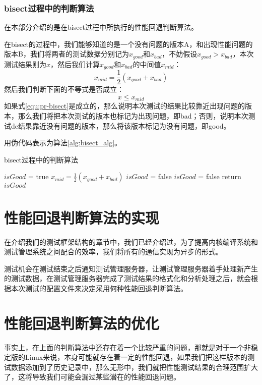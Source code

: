 \subsubsection{bisect过程中的判断算法}
在本部分介绍的是在bisect过程中所执行的性能回退判断算法。

在bisect的过程中，我们能够知道的是一个没有问题的版本A，和出现性能问题的版本B，我们将两者的测试数据分别记为$x_{good}$和$x_{bad}$，不妨假设$x_{good} > x_{bad}$，本次测试结果则为$x$，然后我们计算$x_{good}$和$x_{bad}$的中间值$x_{mid}$：
\begin{equation}
\label{equ:pr-mid}
x_{mid} = \frac{1}{2} (x_{good} + x_{bad})
\end{equation}
然后我们判断下面的不等式是否成立：
\begin{equation}
\label{equ:pr-bisect}
x \leq x_{mid}
\end{equation}
如果式\ref{equ:pr-bisect}是成立的，那么说明本次测试的结果比较靠近出现问题的版本，那么我们将把本次测试的版本也标记为出现问题，即bad；否则，说明本次测试de结果靠近没有问题的版本，那么将该版本标记为没有问题，即good。

用伪代码表示为算法\ref{alg:bisect_alg}。

\begin{algorithm}
\caption{bisect过程中的判断算法}
\label{alg:bisect_alg}
$isGood$ = true\;
$x_{mid} = \frac{1}{2}(x_{good} + x_{bad})$\;
{
	{
		$isGood$ = false\;
	}
}
\Else
{
	{
		$isGood$ = false\;
	}
}
return $isGood$\;
\end{algorithm}

\section{性能回退判断算法的实现}
在介绍我们的测试框架结构的章节中，我们已经介绍过，为了提高内核编译系统和测试管理系统之间配合的效率，我们将所有的通信实现为异步的形式。

测试机会在测试结束之后通知测试管理服务器，让测试管理服务器着手处理新产生的测试数据，在测试管理服务器完成了测试结果的格式化和分析处理之后，就会根据本次测试的配置文件来决定采用何种性能回退判断算法。

\section{性能回退判断算法的优化}
事实上，在上面的判断算法中还存在着一个比较严重的问题，那就是对于一个非稳定版的Linux来说，本身可能就存在着一定的性能回退，如果我们把这样版本的测试数据添加到了历史记录中，那么无形中，我们就把性能测试结果的合理范围扩大了，这将导致我们可能会漏过某些潜在的性能回退问题。


